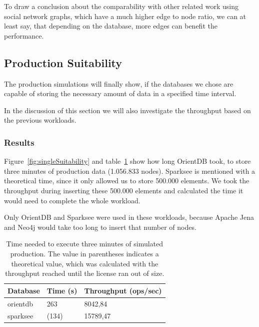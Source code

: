 To draw a conclusion about the comparability with other related work using social network graphs,
which have a much higher edge to node ratio,
we can at least say,
that depending on the database,
more edges can benefit the performance.

\subsection{Production Suitability}
\label{ch:evaluation:se:productionSuitability}
The production simulations will finally show,
if the databases we chose are capable of storing the necessary amount of data in a specified time interval.

In the discussion of this section we will also investigate the throughput based on the previous workloads.

\subsubsection{Results}
Figure~\ref{fig:singleSuitability} and table~\ref{tab:singleSuitability} show how long OrientDB took,
to store three minutes of production data (1.056.833 nodes).
Sparksee is mentioned with a theoretical time,
since it only allowed us to store 500.000 elements.
We took the throughput during inserting these 500.000 elements and calculated the time it would need to complete the whole workload.

Only OrientDB and Sparksee were used in these workloads,
because Apache Jena and Neo4j would take too long to insert that number of nodes.

\begin{table}[h!]
  \begin{minipage}{\textwidth}
    \centering
    \begin{tabular}{ | l | l | l | }
      \hline
      Database & Time (s) & Throughput (ops/sec) \\ \hline
      orientdb & 263 & 8042,84 \\ \hline
      sparksee & (134) & 15789,47 \\ \hline
    \end{tabular}
  \end{minipage}
  \caption{Time needed to execute three minutes of simulated production.
  The value in parentheses indicates a theoretical value,
  which was calculated with the throughput reached until the license ran out of size.}
  \label{tab:singleSuitability}
\end{table}

